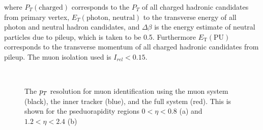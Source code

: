 where $P_{T}(\text{charged})$ corresponds to the $P_{T}$ of all charged hadronic candidates from primary vertex, $E_{T}(\text{photon, neutral})$ 
to the transverse energy of all photon and neutral hadron candidates, and $\Delta \beta$ is the energy estimate of neutral particles due to pileup, which is taken to be 0.5.
Furthermore $E_{\text{T}}(\text{PU})$ corresponds to the transverse momentum of all charged hadronic candidates from pileup.
The muon isolation used is $I_{rel}<0.15$.

\begin{figure}[!hbtp]
\centering
     \\
\caption{The $p_{T}$ resolution for muon identification using the muon system (black), the inner tracker (blue), and the full system (red). This is shown for the pseduorapidity regions $0 < \eta < 0.8$ (a) and  $1.2 < \eta < 2.4$ (b)}
\label{fig:muon_eff}
\end{figure}

